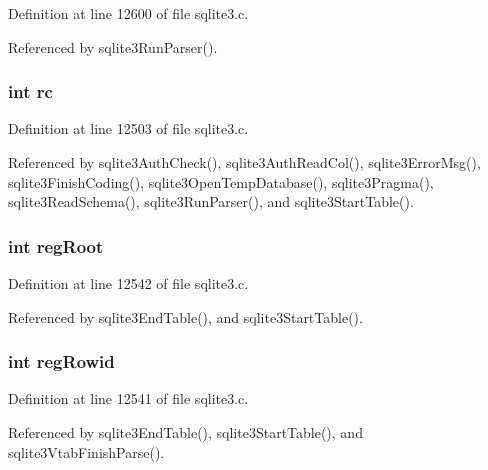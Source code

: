 Definition at line 12600 of file sqlite3.\+c.



Referenced by sqlite3\+Run\+Parser().

\hypertarget{struct_parse_ac6509c6fe4cbf7bde170597172f8a288}{}
\subsubsection[{rc}]{\setlength{\rightskip}{0pt plus 5cm}int rc}\label{struct_parse_ac6509c6fe4cbf7bde170597172f8a288}


Definition at line 12503 of file sqlite3.\+c.



Referenced by sqlite3\+Auth\+Check(), sqlite3\+Auth\+Read\+Col(), sqlite3\+Error\+Msg(), sqlite3\+Finish\+Coding(), sqlite3\+Open\+Temp\+Database(), sqlite3\+Pragma(), sqlite3\+Read\+Schema(), sqlite3\+Run\+Parser(), and sqlite3\+Start\+Table().

\hypertarget{struct_parse_a4c486443f1dec8ebc5ed3d7bebd5ab3f}{}
\subsubsection[{reg\+Root}]{\setlength{\rightskip}{0pt plus 5cm}int reg\+Root}\label{struct_parse_a4c486443f1dec8ebc5ed3d7bebd5ab3f}


Definition at line 12542 of file sqlite3.\+c.



Referenced by sqlite3\+End\+Table(), and sqlite3\+Start\+Table().

\hypertarget{struct_parse_afcd981375c0bf35857b02dd8b6eb404c}{}
\subsubsection[{reg\+Rowid}]{\setlength{\rightskip}{0pt plus 5cm}int reg\+Rowid}\label{struct_parse_afcd981375c0bf35857b02dd8b6eb404c}


Definition at line 12541 of file sqlite3.\+c.



Referenced by sqlite3\+End\+Table(), sqlite3\+Start\+Table(), and sqlite3\+Vtab\+Finish\+Parse().

\hypertarget{struct_parse_a34c336844414b2c1bedbd11eac1f3567}{}
